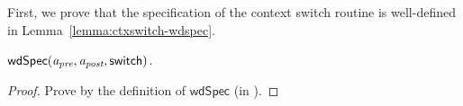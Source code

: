 First, we prove that the specification of
the context switch routine is well-defined in
Lemma~\ref{lemma:ctxswitch-wdspec}.
\begin{lemma}
    \em
    \label{lemma:ctxswitch-wdspec}
    $\textsf{wdSpec}({\textit{a}_\textit{pre}}, {\textit{a}_\textit{post}}, {\mathsf{switch}})$.
\end{lemma}
\begin{proof}
    Prove by the definition of $\textsf{wdSpec}$ 
    (in \Def{\ref{def:well-defined specification}}).
\end{proof}


